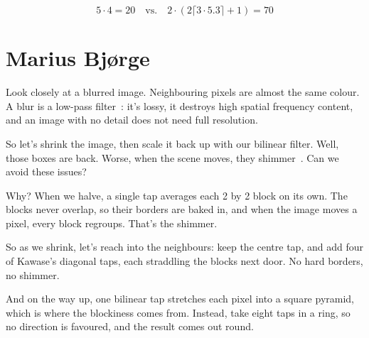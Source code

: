 \documentclass{article}
\begin{document}
\[
    5 \cdot 4 = 20 \quad\text{vs.}\quad 2 \cdot (2 \lceil 3 \cdot 5.3 \rceil + 1) = 70
\]


\section{Marius Bj{\o}rge}

Look closely at a blurred image. Neighbouring pixels are almost the same colour. A blur is a low-pass filter~\cite{web:wikipedia-gaussian-blur}: it's lossy, it destroys high spatial frequency content, and an image with no detail does not need full resolution.

So let's shrink the image, then scale it back up with our bilinear filter. Well, those boxes are back. Worse, when the scene moves, they shimmer~\cite{web:intel-kawase}. Can we avoid these issues?

Why? When we halve, a single tap averages each 2 by 2 block on its own. The blocks never overlap, so their borders are baked in, and when the image moves a pixel, every block regroups. That's the shimmer.

So as we shrink, let's reach into the neighbours: keep the centre tap, and add four of Kawase's diagonal taps, each straddling the blocks next door. No hard borders, no shimmer.

And on the way up, one bilinear tap stretches each pixel into a square pyramid, which is where the blockiness comes from. Instead, take eight taps in a ring, so no direction is favoured, and the result comes out round.
\end{document}
